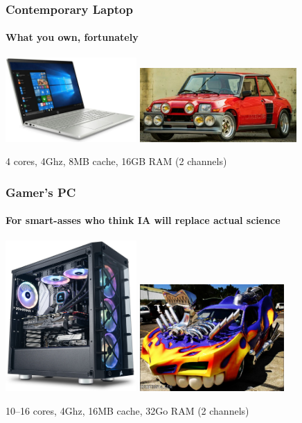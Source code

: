 \documentclass[xcolor={x11names,svgnames,psnames}]{beamer}
\begin{document}
\begin{frame}
  \frametitle{Contemporary Laptop}
  \framesubtitle{What you own, fortunately}
  
  \centering
  \includegraphics[width=5cm]{laptop}%
  \includegraphics[width=6cm]{r5maxi}

    \bigskip

  4 cores, 4Ghz, 8MB cache, 16GB RAM (2 channels)
\end{frame}


\begin{frame}
  \frametitle{Gamer's PC}
  \framesubtitle{For smart-asses who think IA will replace actual science}
  
  \centering
  \includegraphics[width=5cm]{gamer}%
  \hfill%
  \includegraphics[width=5.5cm]{tuning}

    \bigskip

    10--16 cores, 4Ghz, 16MB cache, 32Go RAM (2 channels)
\end{frame}
\end{document}
